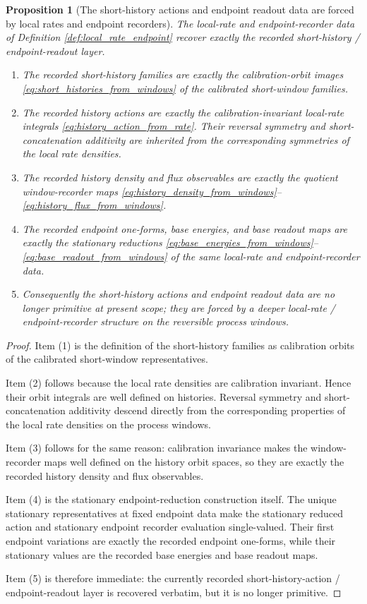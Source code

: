 \documentclass[11pt]{article}
\newtheorem{proposition}{Proposition}
\begin{document}
\begin{proposition}[The short-history actions and endpoint readout data are forced by local rates and endpoint recorders]
\label{prop:actions_and_readouts}
The local-rate and endpoint-recorder data of Definition \ref{def:local_rate_endpoint} recover exactly the recorded short-history / endpoint-readout layer.
\begin{enumerate}
    \item The recorded short-history families are exactly the calibration-orbit images \eqref{eq:short_histories_from_windows} of the calibrated short-window families.
    \item The recorded history actions are exactly the calibration-invariant local-rate integrals \eqref{eq:history_action_from_rate}. Their reversal symmetry and short-concatenation additivity are inherited from the corresponding symmetries of the local rate densities.
    \item The recorded history density and flux observables are exactly the quotient window-recorder maps \eqref{eq:history_density_from_windows}--\eqref{eq:history_flux_from_windows}.
    \item The recorded endpoint one-forms, base energies, and base readout maps are exactly the stationary reductions \eqref{eq:base_energies_from_windows}--\eqref{eq:base_readout_from_windows} of the same local-rate and endpoint-recorder data.
    \item Consequently the short-history actions and endpoint readout data are no longer primitive at present scope; they are forced by a deeper local-rate / endpoint-recorder structure on the reversible process windows.
\end{enumerate}
\end{proposition}

\begin{proof}
Item (1) is the definition of the short-history families as calibration orbits of the calibrated short-window representatives.

Item (2) follows because the local rate densities are calibration invariant. Hence their orbit integrals are well defined on histories. Reversal symmetry and short-concatenation additivity descend directly from the corresponding properties of the local rate densities on the process windows.

Item (3) follows for the same reason: calibration invariance makes the window-recorder maps well defined on the history orbit spaces, so they are exactly the recorded history density and flux observables.

Item (4) is the stationary endpoint-reduction construction itself. The unique stationary representatives at fixed endpoint data make the stationary reduced action and stationary endpoint recorder evaluation single-valued. Their first endpoint variations are exactly the recorded endpoint one-forms, while their stationary values are the recorded base energies and base readout maps.

Item (5) is therefore immediate: the currently recorded short-history-action / endpoint-readout layer is recovered verbatim, but it is no longer primitive.
\end{proof}
\end{document}
